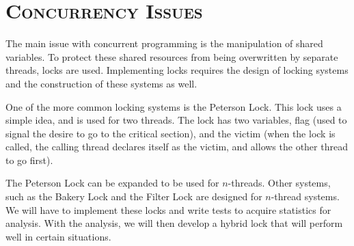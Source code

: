 \documentclass[finalProject.tex]{subfiles}
\begin{document}
\bigskip

\section*{\textsc{\Large Concurrency Issues}}
	
	The main issue with concurrent programming is the manipulation of shared variables.  To protect these shared resources from being overwritten by separate threads, locks are used.  Implementing locks requires the design of locking systems and the construction of these systems as well.  
	
	One of the more common locking systems is the Peterson Lock.  This lock uses a simple idea, and is used for two threads.  The lock has two variables, flag (used to signal the desire to go to the critical section), and the victim (when the lock is called, the calling thread declares itself as the victim, and allows the other thread to go first).  
	
	The Peterson Lock can be expanded to be used for $n$-threads.  Other systems, such as the Bakery Lock and the Filter Lock are designed for $n$-thread systems.  We will have to implement these locks and write tests to acquire statistics for analysis.  With the analysis, we will then develop a hybrid lock that will perform well in certain situations.
\end{document}
